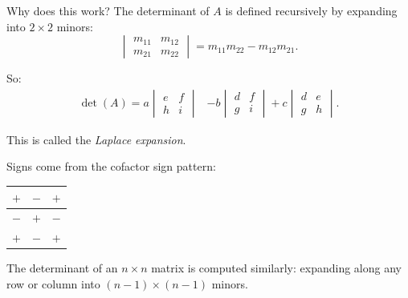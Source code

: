 \documentclass{beamer}
\begin{document}
\begin{frame}{Why does this work?}
The determinant of \(A\) is defined recursively by expanding into \(2 \times 2\) minors:
\begin{equation}
\begin{vmatrix} 
m_{11} & m_{12} \\ m_{21} & m_{22} 
\end{vmatrix} =
m_{11}m_{22} - m_{12}m_{21}.
\end{equation}

So:
\begin{align}
\det(A) =
a 
\begin{vmatrix} 
e & f \\ h & i 
\end{vmatrix}
&- b 
\begin{vmatrix} 
d & f \\ g & i 
\end{vmatrix}
+ c 
\begin{vmatrix} 
d & e \\ g & h 
\end{vmatrix}. 
\end{align}

\vspace{0.2cm}
This is called the \emph{Laplace expansion}.

Signs come from the cofactor sign pattern:
\begin{center}
\begin{tabular}{|c|c|c|}
\hline
\cellcolor{blue!20} \(+\) & \cellcolor{red!20} \(-\) & \cellcolor{blue!20} \(+\) \\ \hline
\cellcolor{red!20} \(-\) & \cellcolor{blue!20} \(+\) & \cellcolor{red!20} \(-\) \\ \hline
\cellcolor{blue!20} \(+\) & \cellcolor{red!20} \(-\) & \cellcolor{blue!20} \(+\) \\ \hline
\end{tabular}
\end{center}
The determinant of an \(n \times n\) matrix is computed similarly: expanding along any row or column into \((n-1) \times (n-1)\) minors.
\end{frame}
\end{document}
